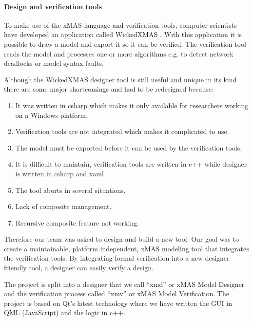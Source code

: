 \paragraph{Design and verification tools}

To make use of the xMAS language and verification tools, computer scientists
have developed an application called WickedXMAS \cite{WickedXmas}.
With this application it is possible to draw a model and export it so it can be
verified. The verification tool reads the model and processes one or more
algorithms e.g. to detect network deadlocks or model syntax faults.

Although the WickedXMAS designer tool is still useful and unique in its kind
there are some major shortcomings and had to be redesigned because:
\begin{enumerate}
\item It was written in csharp which makes it only available for researchers
working on a Windows platform.
\item Verification tools are not integrated which
makes it complicated to use.
\item The model must be exported before it can be
used by the verification tools.
\item It is difficult to maintain, verification tools are written in c++ while
designer is written in csharp and xaml
\item The tool aborts in several situations.
\item Lack of composite management.
\item Recursive composite feature not working.
\end{enumerate}

Therefore our team was asked to design and build a new tool. Our goal was to
create a maintainable, platform independent, xMAS modeling tool that integrates
the verification tools.
By integrating formal verification into a new designer-friendly tool, a designer
can easily verify a design.

The project is split into a designer that we call
``xmd'' or xMAS Model Designer and the verification process called ``xmv'' or
xMAS Model Verification. The project is based on Qt's latest technology where we
have written the GUI in QML (JavaScript) and the logic in c++.

